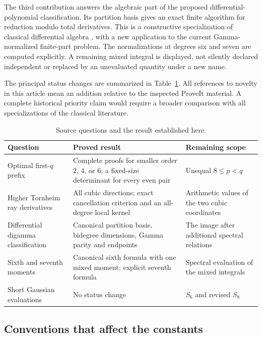 \documentclass[11pt,a4paper]{article}
\numberwithin{equation}{section}
\theoremstyle{plain}
\theoremstyle{definition}
\theoremstyle{remark}
\begin{document}
The third contribution answers the algebraic part of the proposed
differential-polynomial classification. Its partition basis gives
an exact finite algorithm for reduction modulo total derivatives.
This is a constructive specialization of classical differential
algebra \cite{OlverShakiban1978}, with a new application to the current
Gamma-normalized finite-part problem. The normalizations at degrees
six and seven are computed explicitly. A remaining mixed integral is displayed,
not silently declared independent or replaced by an unevaluated
quantity under a new name.

The principal status changes are summarized in
Table~\ref{tab:status}. All references to novelty in this article
mean an addition relative to the inspected ProveIt material.
A complete historical priority claim would require a broader
comparison with all specializations of the classical literature.

\begin{table}[htbp]
\centering\small
\caption{Source questions and the result established here.}
\label{tab:status}
\begin{tabular}{@{}p{}p{}p{}@{}}
\toprule
Question & Proved result & Remaining scope\\
\midrule
Optimal first-$q$ prefix & Complete proofs for smaller order $2$, $4$, or $6$; a fixed-size determinant for every even pair & Unequal $8\le p<q$\\[5pt]
Higher Tornheim ray derivatives & All cubic directions; exact cancellation criterion and an all-degree local kernel & Arithmetic values of the two cubic coordinates\\[5pt]
Differential digamma classification & Canonical partition basis, bidegree dimensions, Gamma parity and endpoints & The image after additional spectral relations\\[5pt]
Sixth and seventh moments & Canonical sixth formula with one mixed moment; explicit seventh formula & Spectral evaluation of the mixed integrals\\[5pt]
Short Gaussian evaluations & No status change & $S_6$ and revised $S_8$\\
\bottomrule
\end{tabular}
\end{table}

\subsection{Conventions that affect the constants}
\end{document}
